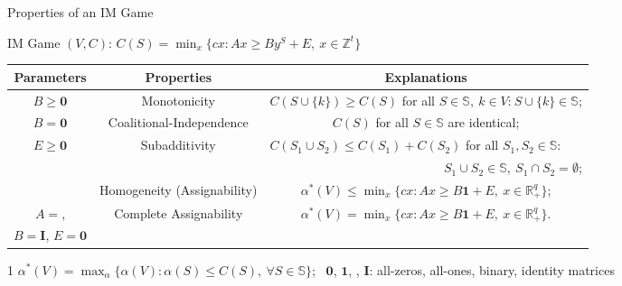 \documentclass[14pt]{beamer}
\newcommand{\R}{\mathbb{R}}
\newcommand{\Z}{\mathbb{Z}}
\begin{document}
\begin{frame}{Properties of an IM Game}
\vspace{-5mm}
\begin{shaded}
\centering
\small
IM Game $(V,C)$: $C(S) = \min_{x} \{ cx: Ax \geq By^S + E, ~x \in \Z^{t} \}$
\end{shaded}
\vspace{-8mm}
\begin{table}
\centering
\scriptsize
\tabcolsep=0pt
\renewcommand\arraystretch{1.9}
\begin{tabular}[!h]{c c c}
\hline
\multicolumn{1}{c}{Parameters} &\multicolumn{1}{c}{Properties}	&\multicolumn{1}{c}{Explanations}\\
\hline
\multicolumn{1}{c}{$B \geq \textbf{0}$} &\multicolumn{1}{c}{Monotonicity}	&\multicolumn{1}{c}{$C(S \cup \{k\}) \geq C(S)$ for all $S \in \mathbb{S}, ~k\in V$:$~S \cup \{k\} \in \mathbb{S}$;}\\
\multicolumn{1}{c}{$B = \textbf{0}$} &\multicolumn{1}{c}{Coalitional-Independence}	&\multicolumn{1}{c}{$C(S)$ for all $S \in \mathbb{S}$ are identical;}\\
\multirow{2}{*}{$E \geq \textbf{0}$} &\multirow{2}{*}{Subadditivity}	&\multicolumn{1}{l}{$C(S_1 \cup S_2) \leq C(S_1)+C(S_2)$ for all $S_1, S_2 \in \mathbb{S}:$}\\
&	&\multicolumn{1}{r}{$S_1 \cup S_2 \in \mathbb{S},~ S_1 \cap S_2 = \emptyset$;}\\
\hdashline
\multicolumn{1}{c}{$E = \textbf{0}$} &\multicolumn{1}{c}{Homogeneity (Assignability)}	&\multicolumn{1}{c}{$\alpha^*(V) \leq \min_x \big\{ cx:Ax \geq B\textbf{1} + E, ~x \in \R_{+}^{q} \big\}$;}\\
\multicolumn{1}{c}{$A =$\textbf{\uppercase\expandafter{\romannumeral2}},} &\multirow{2}{*}{Complete Assignability}	&\multirow{2}{*}{$\alpha^*(V)= \min_x \big\{ cx:Ax \geq B\textbf{1} + E, ~x \in \R_{+}^{q} \big\}$.}\\
\multicolumn{1}{c}{$B = \textbf{I}$, $E = \textbf{0}$} &	&\\
\hline
\end{tabular}
\end{table}
\vspace{-5mm}
\begin{tablenotes}
\tiny
\centering
 \item[1] $\alpha^*(V)=\max_{\alpha}\big\{ \alpha(V):\alpha(S) \leq C(S), ~\forall S \in \mathbb{S} \big\}$;
        ~$\textbf{0}$, $\textbf{1}$, \textbf{\uppercase\expandafter{}}, $\textbf{I}$: all-zeros, all-ones, binary, identity matrices
      \end{tablenotes}
\end{frame}
\end{document}

